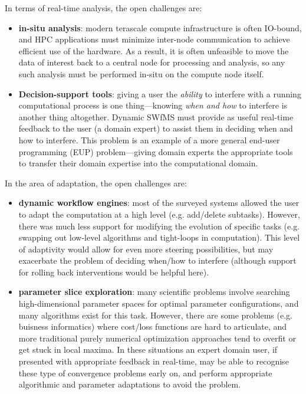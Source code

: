 \documentclass[a4paper]{scrartcl}
\begin{document}
In terms of real-time analysis, the open challenges are:
\begin{itemize}
\item \textbf{in-situ analysis}: modern terascale compute
  infrastructure is often IO-bound, and HPC applications must minimize
  inter-node communication to achieve efficient use of the hardware.
  As a result, it is often unfeasible to move the data of interest
  back to a central node for processing and analysis, so any such
  analysis must be performed in-situ\cite{Bennett2012} on the compute
  node itself.
\item \textbf{Decision-support tools}: giving a user the
  \emph{ability} to interfere with a running computational process is
  one thing---knowing \emph{when and how} to interfere is another
  thing altogether. Dynamic SWfMS must provide as useful real-time
  feedback to the user (a domain expert) to assist them in deciding
  when and how to interfere. This problem is an example of a more
  general end-user programming (EUP)\cite{Myers2006} problem---giving
  domain experts the appropriate tools to transfer their domain
  expertise into the computational domain.
\end{itemize}
In the area of adaptation, the open challenges are:
\begin{itemize}
\item \textbf{dynamic workflow engines}: most of the surveyed systems
  allowed the user to adapt the computation at a high level (e.g.
  add/delete subtasks). However, there was much less support for
  modifying the evolution of specific tasks (e.g. swapping out
  low-level algorithms and tight-loops in computation). This level of
  adaptivity would allow for even more steering possibilities, but may
  exacerbate the problem of deciding when/how to interfere (although
  support for rolling back interventions would be helpful here).
\item \textbf{parameter slice exploration}: many scientific problems
  involve searching high-dimensional parameter spaces for optimal
  parameter configurations, and many algorithms exist for this task.
  However, there are some problems (e.g. buisness informatics) where
  cost/loss functions are hard to articulate, and more traditional
  purely numerical optimization approaches tend to overfit or get
  stuck in local maxima. In these situations an expert domain user, if
  presented with appropriate feedback in real-time, may be able to
  recognise these type of convergence problems early on, and perform
  appropriate algorithmic and parameter adaptations to avoid the
  problem.
\end{itemize}
\end{document}
